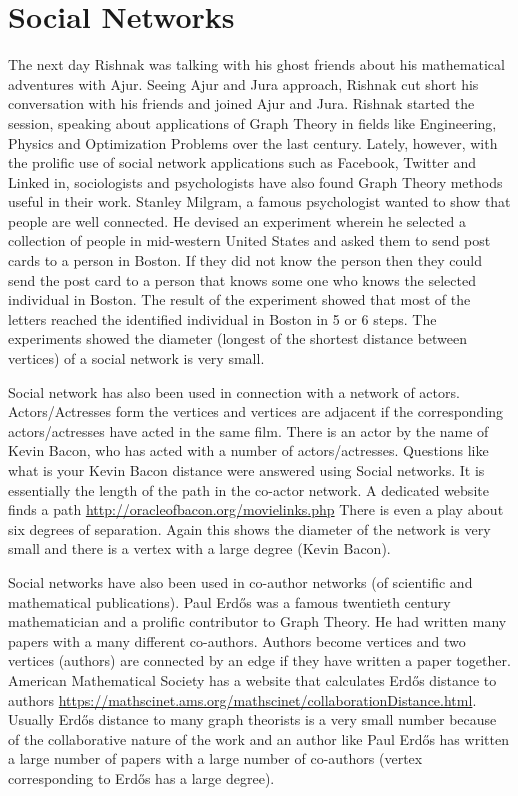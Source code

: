 \chapter{Social Networks}

 The next day Rishnak was talking with his ghost friends about his mathematical adventures with Ajur. Seeing Ajur and Jura approach, Rishnak cut short his conversation with his friends and joined Ajur and Jura. Rishnak started the session, speaking about applications of Graph Theory in 
  fields like Engineering, Physics and Optimization Problems over the last century. Lately, however,  with the prolific use of social network applications such as Facebook, Twitter and Linked in, sociologists and psychologists have also found Graph Theory methods useful in their work.  
Stanley Milgram, a famous psychologist wanted to show that people are well connected. He devised an experiment wherein he selected a collection of people in mid-western United States and asked them to send post cards to a person in Boston. If they did not know the person then they could send the post card to a person that knows some one who knows the selected individual in Boston. The result of the experiment showed that most of the letters reached the identified individual in Boston in 5 or 6 steps. The experiments showed the diameter (longest of the shortest distance between vertices) of a social network is very small.

Social network has also been used in connection with a network of actors. Actors/Actresses form the vertices and vertices are adjacent if the corresponding actors/actresses have acted in the same film. There is an actor by the name of Kevin Bacon, who has acted with a number of actors/actresses. Questions like what is your Kevin Bacon distance were answered using Social networks. It is essentially the length of the path  in the co-actor network. A dedicated website finds a path \url{http://oracleofbacon.org/movielinks.php} There is even a play about six degrees of separation. Again this shows the diameter of the network is very small and there is a vertex with a large degree (Kevin Bacon).

Social networks have also been used in co-author networks (of scientific and mathematical publications). Paul Erd\H{o}s was a famous twentieth century mathematician and a prolific contributor to Graph Theory. He had written many papers with a many different  co-authors. Authors become vertices and two vertices (authors) are connected by an edge if they have written a paper together. American Mathematical Society has a website that calculates Erd\H{o}s distance to authors
\url{https://mathscinet.ams.org/mathscinet/collaborationDistance.html}. Usually Erd\H{o}s distance to many graph theorists is a very small number because of the collaborative nature of the work and an author like Paul Erd\H{o}s has written a large number of papers with a large number of co-authors (vertex corresponding to Erd\H{o}s has a large degree).


